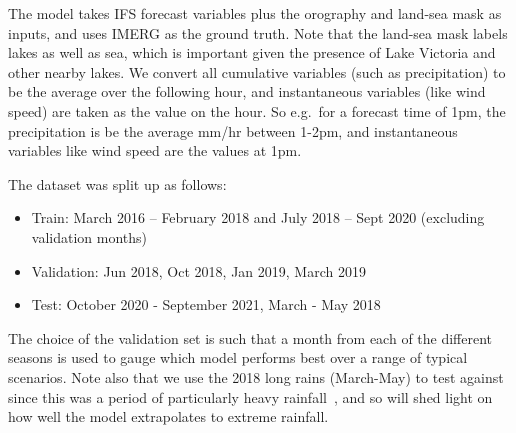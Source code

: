 \documentclass[../main.tex]{subfiles}
\begin{document}
The model takes IFS forecast variables plus the orography and land-sea mask as inputs, and uses IMERG as the ground truth. Note that the land-sea mask labels lakes as well as sea, which is important given the presence of Lake Victoria and other nearby lakes. We convert all cumulative variables (such as precipitation) to be the average over the following hour, and instantaneous variables (like wind speed) are taken as the value on the hour. So e.g.~for a forecast time of 1pm, the precipitation is be the average mm/hr between 1-2pm, and instantaneous variables like wind speed are the values at 1pm. 

The dataset was split up as follows:
\begin{itemize}
    \item Train: March 2016 – February 2018 and July 2018 – Sept 2020 (excluding validation months)
    \item Validation: Jun 2018, Oct 2018, Jan 2019, March 2019
    \item Test: October 2020 - September 2021, March - May 2018
\end{itemize}
The choice of the validation set is such that a month from each of the different seasons is used to gauge which model performs best over a range of typical scenarios. Note also that we use the 2018 long rains (March-May) to test against since this was a period of particularly heavy rainfall~\citep{kilavi_extreme_2018}, and so will shed light on how well the model extrapolates to extreme rainfall. 




\ifSubfilesClassLoaded{%
    
    

}{}
\end{document}
